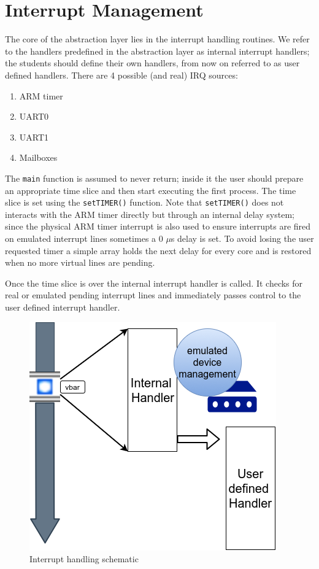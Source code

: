 \documentclass[12pt,a4paper,openright,twoside]{report}
\begin{document}
\section{Interrupt Management}
\label{regcorruption}
The core of the abstraction layer lies in the interrupt handling routines. We refer
to the handlers predefined in the abstraction layer as internal interrupt handlers;
 the students should define their own handlers, from now on referred to as user defined handlers.
There are 4 possible (and real) IRQ sources:
\begin{enumerate}
    \item ARM timer
    \item UART0
    \item UART1
    \item Mailboxes
\end{enumerate}
The {\tt main} function is assumed to never return; inside it the user should
prepare an appropriate time slice and then start executing the first process.
The time slice is set using the {\tt setTIMER()} function.
Note that {\tt setTIMER()} does not interacts with the ARM timer directly but 
through an internal delay system; since the physical ARM timer interrupt is also
used to ensure interrupts are fired on emulated interrupt lines sometimes a
0 $\mu$s delay is set. To avoid losing the user requested timer a simple array 
holds the next delay for every core and is restored when no more virtual 
lines are pending.

 Once the time slice is over the internal interrupt handler is called. 
 It checks for real or emulated pending interrupt lines and immediately
 passes control to the user defined interrupt handler.

 \begin{figure}[h]
    \begin{center}
 \includegraphics[scale=0.7]{images/tesi6.png}
 \caption[IRQ Switch]{Interrupt handling schematic}\label{fig:irq}
    \end{center}
 \end{figure}
\end{document}
